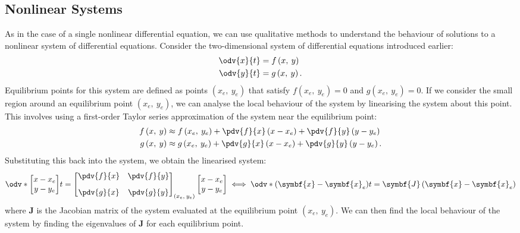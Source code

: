 \documentclass{article}
\begin{document}
\subsection{Nonlinear Systems}
As in the case of a single nonlinear differential equation, we can use
qualitative methods to understand the behaviour of solutions to a
nonlinear system of differential equations. Consider the
two-dimensional system of differential equations introduced earlier:
\begin{align*}
    \odv{x}{t} & = f\left( x,\: y \right)  \\
    \odv{y}{t} & = g\left( x,\: y \right).
\end{align*}
Equilibrium points for this system are defined as points \(\left( x_e,\: y_e \right)\)
that satisfy \(f\left( x_e,\: y_e \right) = 0\) and \(g\left( x_e,\: y_e \right) = 0\).
If we consider the small region around an equilibrium point
\(\left( x_e,\: y_e \right)\), we can analyse the local behaviour of
the system by linearising the system about this point. This involves
using a first-order Taylor series approximation of the system near the
equilibrium point:
\begin{align*}
    f\left( x,\: y \right) & \approx f\left( x_e,\: y_e \right) + \pdv{f}{x}\left( x - x_e \right) + \pdv{f}{y}\left( y - y_e \right)  \\
    g\left( x,\: y \right) & \approx g\left( x_e,\: y_e \right) + \pdv{g}{x}\left( x - x_e \right) + \pdv{g}{y}\left( y - y_e \right).
\end{align*}
Substituting this back into the system, we obtain the linearised system:
\begin{equation*}
    \odv*{\begin{bmatrix}
        x - x_e \\
        y - y_e
    \end{bmatrix}}{t} =
    \begin{bmatrix}
        \displaystyle \pdv{f}{x} & \displaystyle \pdv{f}{y} \\[2ex]
        \displaystyle \pdv{g}{x} & \displaystyle \pdv{g}{y}
    \end{bmatrix}
    _{\left( x_e,\: y_e \right)}
    \begin{bmatrix}
        x - x_e \\
        y - y_e
    \end{bmatrix}
    \iff \odv*{\left( \symbf{x} - \symbf{x}_e \right)}{t} = \symbf{J} \left( \symbf{x} - \symbf{x}_e \right)
\end{equation*}
where \(\symbf{J}\) is the Jacobian matrix of the system evaluated at
the equilibrium point \(\left( x_e,\: y_e \right)\). We can then find
the local behaviour of the system by finding the eigenvalues of
\(\symbf{J}\) for each equilibrium point.
\end{document}
